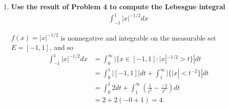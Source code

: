 \documentclass[a4paper,12pt]{article}
\begin{document}
\begin{enumerate}
    \item
        \boldmath\textbf{Use the result of Problem 4 to compute the Lebesgue integral
        \begin{align*}
            \int_{-1}^1 |x|^{-1/2} dx
        \end{align*}
        }\unboldmath \par
        $f(x) = |x|^{-1/2}$ is nonnegative and integrable on the measurable set $E = [-1, 1]$, and so
        \begin{align*}
            \int_{-1}^1 |x|^{-1/2} dx &= \int_0^\infty |\{ x \in [-1, 1] : |x|^{-1/2} > t \}| dt \\
            &= \int_0^1 |[-1, 1]| dt + \int_1^\infty |\{ |x| < t^{-2} \}| dt \\
            &= \int_0^1 2dt + \int_1^\infty \left( \frac{1}{t^2} - \frac{-1}{t^2} \right) dt \\
            &= 2 + 2(-0 + 1) = 4.
        \end{align*}
\end{enumerate}
\end{document}

